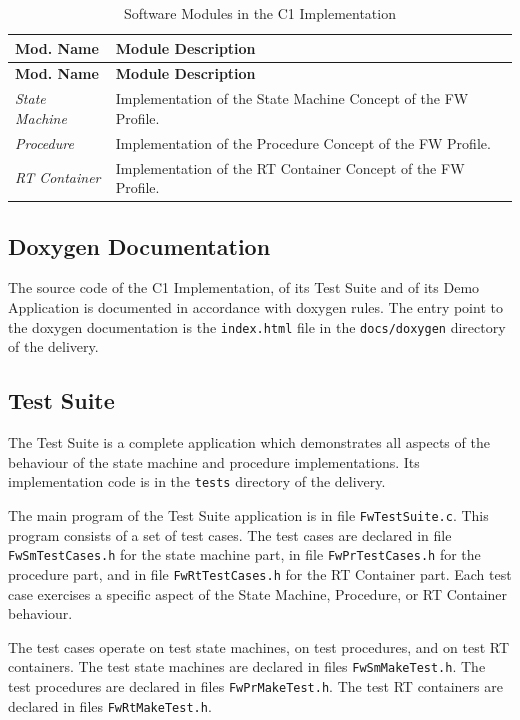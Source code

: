 \documentclass[manual]{../fwprofile}
\begin{document}
\begin{longtable}{|p{2.3cm}|p{6.4cm}|}
\caption{Software Modules in the C1 Implementation} \label{tab:swpkg}\\
\hline
\rowcolor{gray}
\textbf{Mod. Name} & \textbf{Module Description} \\
\hline\hline
\endfirsthead
\rowcolor{gray}
\textbf{Mod. Name} & \textbf{Module Description} \\
\hline\hline
\endhead
%
\emph{State Machine} & Implementation of the State Machine Concept of the FW Profile. \\
\hline
\emph{Procedure} & Implementation of the Procedure Concept of the FW Profile. \\
\hline
\emph{RT Container} & Implementation of the RT Container Concept of the FW Profile. \\
\hline
\end{longtable}

\subsection{Doxygen Documentation}\label{sec:doxygenDoc}
The source code of the C1 Implementation, of its Test Suite and of its Demo Application is documented in accordance with doxygen rules. The entry point to the doxygen documentation is the \texttt{index.html} file in the \texttt{docs/doxygen} directory of the delivery.

\subsection{Test Suite}\label{sec:testSuite}
The Test Suite is a complete application which demonstrates all aspects of the behaviour of the state machine and procedure implementations. Its implementation code is in the \texttt{tests} directory of the delivery.

The main program of the Test Suite application is in file \texttt{FwTestSuite.c}. 
This program consists of a set of test cases. 
The test cases are declared in file \texttt{FwSmTestCases.h} for the state machine part, in file \texttt{FwPrTestCases.h} for the procedure part, and in file \texttt{FwRtTestCases.h} for the RT Container part. 
Each test case exercises a specific aspect of the State Machine, Procedure, or RT Container behaviour.

The test cases operate on test state machines, on test procedures, and on test RT containers. 
The test state machines are declared in files \texttt{FwSmMakeTest.h}. 
The test procedures are declared in files \texttt{FwPrMakeTest.h}.
The test RT containers are declared in files \texttt{FwRtMakeTest.h}.
\end{document}
